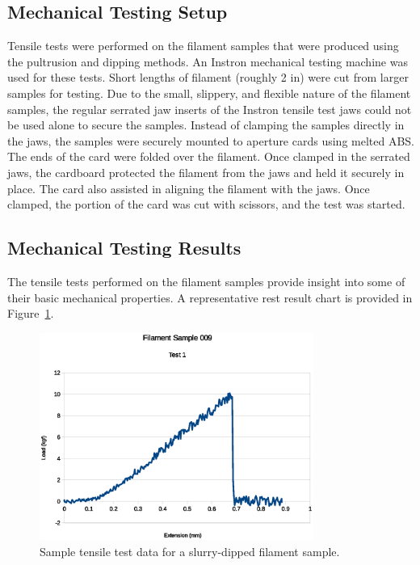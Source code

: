 \subsection{Mechanical Testing Setup}

Tensile tests were performed on the filament samples that were produced using the pultrusion and dipping methods. An Instron mechanical testing machine was used for these tests. Short lengths of filament (roughly 2 in) were cut from larger samples for testing. Due to the small, slippery,  and flexible nature of the filament samples, the regular serrated jaw inserts of the Instron tensile test jaws could not be used alone to secure the samples. Instead of clamping the samples directly in the jaws, the samples were securely mounted to aperture cards using melted ABS. The ends of the card were folded over the filament. Once clamped in the serrated jaws, the cardboard protected the filament from the jaws and held it securely in place. The card also assisted in aligning the filament with the jaws. Once clamped, the portion of the card was cut with scissors, and the test was started.

\subsection{Mechanical Testing Results}

The tensile tests performed on the filament samples provide insight into some of their basic mechanical properties. A representative rest result chart is provided in Figure~\ref{fig:instron-sample}. 

\begin{figure}[htp]
    \centering
    \includegraphics[width=0.8\textwidth]{./figures/009T1-instron-data}
    \caption{Sample tensile test data for a slurry-dipped filament sample.}
    \label{fig:instron-sample}
\end{figure}



